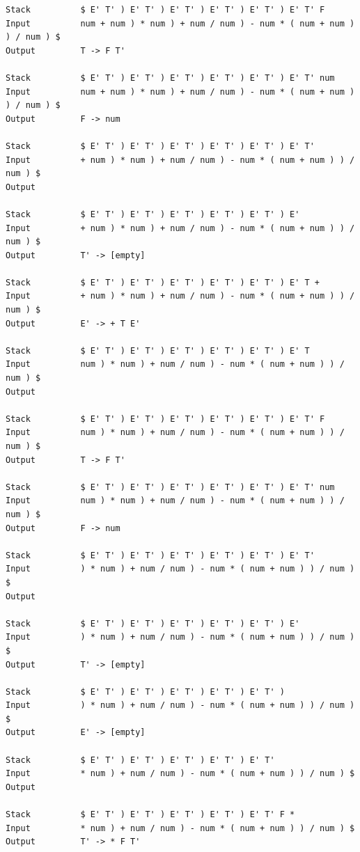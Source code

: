\documentclass[lang=cn,11pt,a4paper,cite=authornum]{paper}
\begin{document}
\begin{code}
\begin{verbatim}
Stack          $ E' T' ) E' T' ) E' T' ) E' T' ) E' T' ) E' T' F 
Input          num + num ) * num ) + num / num ) - num * ( num + num ) ) / num ) $ 
Output         T -> F T' 

Stack          $ E' T' ) E' T' ) E' T' ) E' T' ) E' T' ) E' T' num 
Input          num + num ) * num ) + num / num ) - num * ( num + num ) ) / num ) $ 
Output         F -> num 

Stack          $ E' T' ) E' T' ) E' T' ) E' T' ) E' T' ) E' T' 
Input          + num ) * num ) + num / num ) - num * ( num + num ) ) / num ) $ 
Output         

Stack          $ E' T' ) E' T' ) E' T' ) E' T' ) E' T' ) E' 
Input          + num ) * num ) + num / num ) - num * ( num + num ) ) / num ) $ 
Output         T' -> [empty] 

Stack          $ E' T' ) E' T' ) E' T' ) E' T' ) E' T' ) E' T + 
Input          + num ) * num ) + num / num ) - num * ( num + num ) ) / num ) $ 
Output         E' -> + T E' 

Stack          $ E' T' ) E' T' ) E' T' ) E' T' ) E' T' ) E' T 
Input          num ) * num ) + num / num ) - num * ( num + num ) ) / num ) $ 
Output         

Stack          $ E' T' ) E' T' ) E' T' ) E' T' ) E' T' ) E' T' F 
Input          num ) * num ) + num / num ) - num * ( num + num ) ) / num ) $ 
Output         T -> F T' 

Stack          $ E' T' ) E' T' ) E' T' ) E' T' ) E' T' ) E' T' num 
Input          num ) * num ) + num / num ) - num * ( num + num ) ) / num ) $ 
Output         F -> num 

Stack          $ E' T' ) E' T' ) E' T' ) E' T' ) E' T' ) E' T' 
Input          ) * num ) + num / num ) - num * ( num + num ) ) / num ) $ 
Output         

Stack          $ E' T' ) E' T' ) E' T' ) E' T' ) E' T' ) E' 
Input          ) * num ) + num / num ) - num * ( num + num ) ) / num ) $ 
Output         T' -> [empty] 

Stack          $ E' T' ) E' T' ) E' T' ) E' T' ) E' T' ) 
Input          ) * num ) + num / num ) - num * ( num + num ) ) / num ) $ 
Output         E' -> [empty] 

Stack          $ E' T' ) E' T' ) E' T' ) E' T' ) E' T' 
Input          * num ) + num / num ) - num * ( num + num ) ) / num ) $ 
Output         

Stack          $ E' T' ) E' T' ) E' T' ) E' T' ) E' T' F * 
Input          * num ) + num / num ) - num * ( num + num ) ) / num ) $ 
Output         T' -> * F T' 


\end{verbatim}
\end{code}
\end{document}
